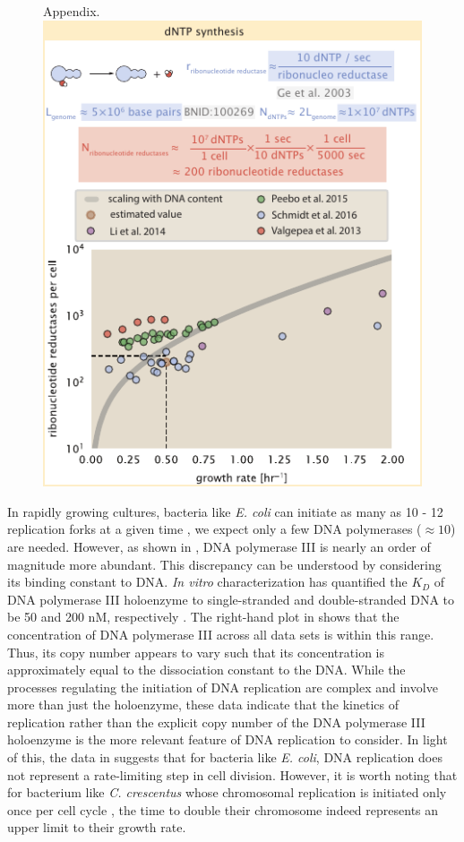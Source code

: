 \begin{figure}
{    Appendix.}{\includegraphics{main_figs/fig7-S1_dNTP_synthesis.pdf}}\label{figsupp:dntp}
\end{figure}

In rapidly growing cultures, bacteria like \textit{E. coli}
can initiate as many as 10 - 12 replication forks at a
given time \citep{bremer2008, si2017},  we expect only a few DNA polymerases
($\approx 10$) are needed. However, as shown in , DNA
polymerase III is nearly an order of magnitude more abundant. This discrepancy
can be understood by considering its binding constant to DNA. \textit{In vitro} characterization has quantified the $K_D$ of
DNA polymerase III holoenzyme to single-stranded and double-stranded DNA to be
50 and 200 nM, respectively \citep{ason2000}. The right-hand plot in
 shows that the concentration of DNA polymerase III
across all data sets is within this range. Thus, its copy number appears to vary such that its
concentration is approximately equal to the dissociation constant to the DNA.
While the processes regulating the initiation of DNA replication are complex and
involve more than just the holoenzyme, these data indicate that the kinetics of
replication rather than the explicit copy number of the DNA polymerase III
holoenzyme is the more relevant feature of DNA replication to consider. In light
of this, the data in  suggests that for bacteria like
\textit{E. coli}, DNA replication does not represent a rate-limiting step in
cell division. However, it is worth noting that for bacterium like \textit{C.
crescentus} whose chromosomal replication is initiated only once per cell cycle
\citep{jensen2001}, the time to double their chromosome indeed represents an
upper limit to their growth rate.
